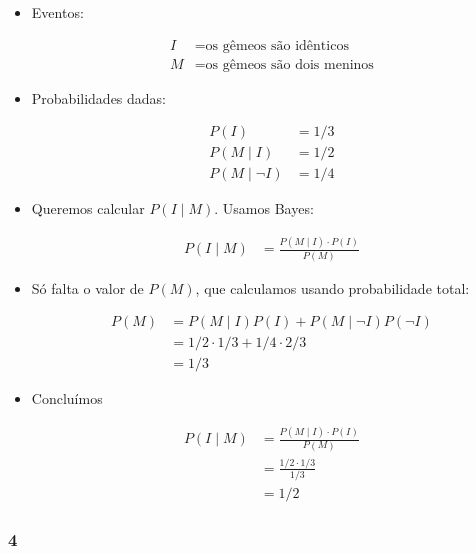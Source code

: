 \documentclass[
  11pt]{report}
\begin{document}
\begin{itemize}
\item
  Eventos:

  \[
  \begin{aligned}
  I &= \text{os gêmeos são idênticos} \\
  M &= \text{os gêmeos são dois meninos}
  \end{aligned}
  \]
\item
  Probabilidades dadas:

  \[
  \begin{aligned}
  P(I) &= 1/3 \\
  P(M \mid I) &= 1/2 \\
  P(M \mid \neg I) &= 1/4
  \end{aligned}
  \]
\item
  Queremos calcular $P(I \mid M)$. Usamos Bayes:

  \[
  \begin{aligned}
  P(I \mid M) 
  &=
  \frac{P(M \mid I) \cdot P(I)}{P(M)}
  \end{aligned}
  \]
\item
  Só falta o valor de $P(M)$, que calculamos usando probabilidade total:

  \[
  \begin{aligned}
  P(M) 
  &=
  P(M \mid I)P(I) + P(M \mid \neg I)P(\neg I) \\
  &=
  1/2 \cdot 1/3 + 1/4 \cdot 2/3 \\
  &=
  1/3
  \end{aligned}
  \]
\item
  Concluímos

  \[
  \begin{aligned}
  P(I \mid M) 
  &=
  \frac{P(M \mid I) \cdot P(I)}{P(M)} \\
  &=
  \frac{1/2 \cdot 1/3}{1/3} \\
  &=
  1/2
  \end{aligned}
  \]
\end{itemize}

\hypertarget{section-11}{%
\subsubsection*{4}\label{section-11}}
\end{document}
